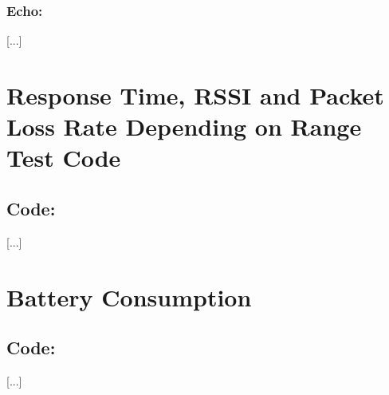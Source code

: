 \subsubsection*{Echo:}
[...]
%

\section*{Response Time, RSSI and Packet Loss Rate Depending on Range Test Code}
\subsection*{Code:}
[...]
%

\section*{Battery Consumption}
\subsection*{Code:}
[...]
%
